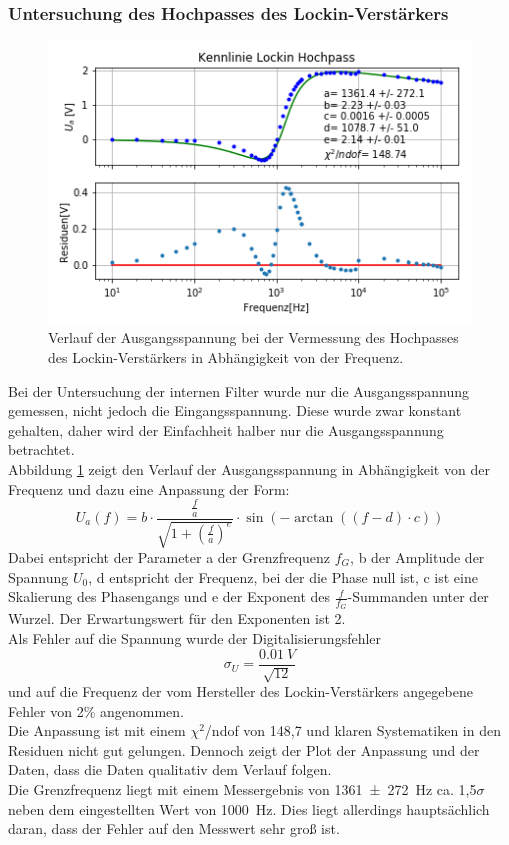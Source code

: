 \documentclass[12pt,a4paper]{article}
\begin{document}
\subsubsection{Untersuchung des Hochpasses des Lockin-Verstärkers}

\begin{figure}
\centering
\includegraphics[scale=1]{Bilder/Vorversuch2/KennlinieHochpass.png}
\caption[test]{Verlauf der Ausgangsspannung bei der Vermessung des Hochpasses des Lockin-Verstärkers in Abhängigkeit von der Frequenz.}
\label{fig:LockinHochpass_Verlauf}
\end{figure}

Bei der Untersuchung der internen Filter wurde nur die Ausgangsspannung gemessen, nicht jedoch die Eingangsspannung. Diese wurde zwar konstant gehalten, daher wird der Einfachheit halber nur die Ausgangsspannung betrachtet. \\
Abbildung \ref{fig:LockinHochpass_Verlauf} zeigt den Verlauf der Ausgangsspannung in Abhängigkeit von der Frequenz und dazu eine Anpassung der Form:
\begin{equation*}
U_a (f) = b \cdot \dfrac{\frac{f}{a}}{\sqrt{1 + \left( \frac{f}{a} \right)^e}} \cdot \sin \left( - \arctan \left( \left( f-d \right) \cdot c \right) \right)
\end{equation*}
Dabei entspricht der Parameter a der Grenzfrequenz $f_G$, b der Amplitude der Spannung $U_0$, d entspricht der Frequenz, bei der die Phase null ist, c ist eine Skalierung des Phasengangs und e der Exponent des $\frac{f}{f_G}$-Summanden unter der Wurzel. Der Erwartungswert für den Exponenten ist 2. \\
Als Fehler auf die Spannung wurde der Digitalisierungsfehler 
\begin{equation*}
\sigma _U = \dfrac{\SI{0.01}{V}}{\sqrt{12}}
\end{equation*}
und auf die Frequenz der vom Hersteller des Lockin-Verstärkers angegebene Fehler von 2\% angenommen. \\
Die Anpassung ist mit einem $\chi ^2$/ndof von 148,7 und klaren Systematiken in den Residuen nicht gut gelungen. Dennoch zeigt der Plot der Anpassung und der Daten, dass die Daten qualitativ dem Verlauf folgen. \\
Die Grenzfrequenz liegt mit einem Messergebnis von \SI{1361 \pm 272}{Hz} ca. 1,5$\sigma$ neben dem eingestellten Wert von \SI{1000}{Hz}. Dies liegt allerdings hauptsächlich daran, dass der Fehler auf den Messwert sehr groß ist.
\end{document}
